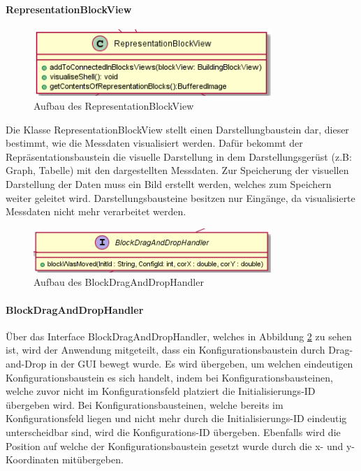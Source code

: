 \documentclass[parskip=full]{scrartcl}
\begin{document}
\paragraph{RepresentationBlockView} 

\begin{figure}[htbp]
	\begin{center}
		\includegraphics[width = 9cm]{Grafiken/View/RepresentationBlockView.png}
		\caption{Aufbau des RepresentationBlockView}
		\label{Entwurf_Grob}
	\end{center}
\end{figure}

Die Klasse RepresentationBlockView stellt einen Darstellungbaustein dar, dieser bestimmt, wie die Messdaten visualisiert werden. Dafür bekommt der Repräsentationsbaustein die visuelle Darstellung in dem Darstellungsgerüst (z.B: Graph, Tabelle) mit den dargestellten Messdaten.
Zur Speicherung der visuellen Darstellung der Daten muss ein Bild erstellt werden, welches zum Speichern weiter geleitet wird.
Darstellungsbausteine besitzen nur Eingänge, da visualisierte Messdaten nicht mehr verarbeitet werden. 

\clearpage

\begin{figure}[htbp]
	\begin{center}
		\includegraphics[width = 9cm]{Grafiken/View/BlockDragAndDropHandler.png}
		\caption{Aufbau des BlockDragAndDropHandler}
		\label{BlockDragAndDropHandler}
	\end{center}
\end{figure}

\paragraph{BlockDragAndDropHandler}

Über das Interface BlockDragAndDropHandler, welches in Abbildung \ref{BlockDragAndDropHandler} zu sehen ist, wird der Anwendung mitgeteilt, dass ein Konfigurationsbaustein durch Drag-and-Drop in der GUI bewegt wurde. Es wird übergeben, um welchen eindeutigen Konfigurationsbaustein es sich handelt, indem bei Konfigurationsbausteinen, welche zuvor nicht im Konfigurationsfeld platziert die Initialisierungs-ID übergeben wird. Bei Konfigurationsbausteinen, welche bereits im Konfigurationsfeld liegen und nicht mehr durch die Initialisierungs-ID eindeutig unterscheidbar sind, wird die Konfigurations-ID übergeben. Ebenfalls wird die Position auf welche der Konfigurationsbaustein gesetzt wurde durch die x- und y- Koordinaten mitübergeben.
\end{document}
